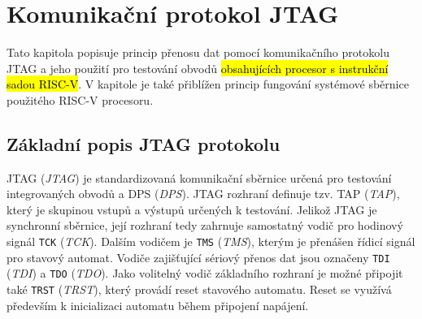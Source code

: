 \chapter{Komunikační protokol JTAG}
Tato kapitola popisuje princip přenosu dat pomocí komunikačního protokolu JTAG a jeho použití pro testování obvodů \hl{obsahujících procesor s instrukční sadou {\acs{RISC-V}}}. V kapitole je také přiblížen princip fungování systémové sběrnice použitého \acs{RISC-V} procesoru.

\section{Základní popis \acs{JTAG} protokolu}
\acs{JTAG} (\textit{\acl{JTAG}}) je standardizovaná komunikační sběrnice určená pro testování integrovaných obvodů a \acs{DPS} (\textit{\acl{DPS}}).
\acs{JTAG} rozhraní definuje tzv. \acs{TAP} (\textit{\acl{TAP}}), který je skupinou vstupů a výstupů určených k testování. Jelikož \acs{JTAG} je synchronní sběrnice, její rozhraní tedy zahrnuje samostatný vodič pro hodinový signál \texttt{\acs{TCK}} (\textit{\acl{TCK}}). Dalším vodičem je \texttt{\acs{TMS}} (\textit{\acl{TMS}}), kterým je přenášen řídicí signál pro stavový automat. Vodiče zajišťující sériový přenos dat jsou označeny \texttt{\acs{TDI}} (\textit{\acl{TDI}}) a \texttt{\acs{TDO}} (\textit{\acl{TDO}}). Jako volitelný vodič základního rozhraní je možné připojit také \texttt{\acs{TRST}} (\textit{\acl{TRST}}), který provádí reset stavového automatu. Reset se využívá především k inicializaci automatu během připojení napájení. \cite {IEEE_1149-1} \cite{JTAG}

